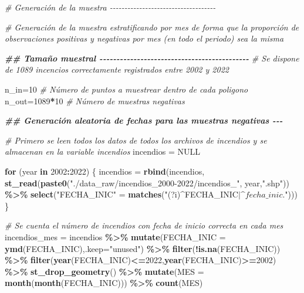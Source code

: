 \documentclass[12pt,a4paper,]{book}
\newenvironment{Shaded}{\begin{snugshade}}{\end{snugshade}}
\newcommand{\AttributeTok}[1]{\textcolor[rgb]{0.13,0.29,0.53}{#1}}
\newcommand{\CommentTok}[1]{\textcolor[rgb]{0.56,0.35,0.01}{\textit{#1}}}
\newcommand{\ConstantTok}[1]{\textcolor[rgb]{0.56,0.35,0.01}{#1}}
\newcommand{\ControlFlowTok}[1]{\textcolor[rgb]{0.13,0.29,0.53}{\textbf{#1}}}
\newcommand{\DecValTok}[1]{\textcolor[rgb]{0.00,0.00,0.81}{#1}}
\newcommand{\DocumentationTok}[1]{\textcolor[rgb]{0.56,0.35,0.01}{\textbf{\textit{#1}}}}
\newcommand{\FunctionTok}[1]{\textcolor[rgb]{0.13,0.29,0.53}{\textbf{#1}}}
\newcommand{\NormalTok}[1]{#1}
\newcommand{\OtherTok}[1]{\textcolor[rgb]{0.56,0.35,0.01}{#1}}
\newcommand{\SpecialCharTok}[1]{\textcolor[rgb]{0.81,0.36,0.00}{\textbf{#1}}}
\newcommand{\StringTok}[1]{\textcolor[rgb]{0.31,0.60,0.02}{#1}}
\numberwithin{dummy}{section}
\theoremstyle{ocrenumbox}
\theoremstyle{blacknumex}
\theoremstyle{blacknumbox}
\theoremstyle{ocrenum}
\theoremstyle{ocrenum}
\begin{document}
\begin{Shaded}
\begin{Highlighting}[]
\CommentTok{\# Generación de la muestra {-}{-}{-}{-}{-}{-}{-}{-}{-}{-}{-}{-}{-}{-}{-}{-}{-}{-}{-}{-}{-}{-}{-}{-}{-}{-}{-}{-}{-}{-}{-}{-}{-}{-}{-}{-}}

\CommentTok{\# Generación de la muestra estratificando por mes de forma que la proporción de observaciones positivas y negativas por mes (en todo el periodo) sea la misma}

\DocumentationTok{\#\#  Tamaño muestral {-}{-}{-}{-}{-}{-}{-}{-}{-}{-}{-}{-}{-}{-}{-}{-}{-}{-}{-}{-}{-}{-}{-}{-}{-}{-}{-}{-}{-}{-}{-}{-}{-}{-}{-}{-}{-}{-}{-}{-}{-}{-}{-}{-}}
\CommentTok{\# Se dispone de 1089 incencios correctamente registrados entre 2002 y 2022}

\NormalTok{n\_in}\OtherTok{=}\DecValTok{10} \CommentTok{\# Número de puntos a muestrear dentro de cada poligono}
\NormalTok{n\_out}\OtherTok{=}\DecValTok{1089}\SpecialCharTok{*}\DecValTok{10} \CommentTok{\# Número de muestras negativas}

\DocumentationTok{\#\#  Generación aleatoria de fechas para las muestras negativas {-}{-}{-}}

\CommentTok{\# Primero se leen todos los datos de todos los archivos de incendios y se almacenan en la variable incendios}
\NormalTok{incendios }\OtherTok{=} \ConstantTok{NULL}

\ControlFlowTok{for}\NormalTok{ (year }\ControlFlowTok{in} \DecValTok{2002}\SpecialCharTok{:}\DecValTok{2022}\NormalTok{) \{}
\NormalTok{  incendios }\OtherTok{=} \FunctionTok{rbind}\NormalTok{(incendios, }
                    \FunctionTok{st\_read}\NormalTok{(}\FunctionTok{paste0}\NormalTok{(}\StringTok{"./data\_raw/incendios\_2000{-}2022/incendios\_"}\NormalTok{,}
\NormalTok{                                   year,}\StringTok{".shp"}\NormalTok{)) }\SpecialCharTok{\%\textgreater{}\%} 
                      \FunctionTok{select}\NormalTok{(}\StringTok{"FECHA\_INIC"} \OtherTok{=} \FunctionTok{matches}\NormalTok{(}\StringTok{"(?i)\^{}FECHA\_INIC$|\^{}fecha\_inic.$"}\NormalTok{))) }
\NormalTok{\}}

\CommentTok{\# Se cuenta el número de incendios con fecha de inicio correcta en cada mes}
\NormalTok{incendios\_mes }\OtherTok{=}\NormalTok{ incendios }\SpecialCharTok{\%\textgreater{}\%} 
  \FunctionTok{mutate}\NormalTok{(}\AttributeTok{FECHA\_INIC =} \FunctionTok{ymd}\NormalTok{(FECHA\_INIC),}\AttributeTok{.keep=}\StringTok{"unused"}\NormalTok{) }\SpecialCharTok{\%\textgreater{}\%} 
  \FunctionTok{filter}\NormalTok{(}\SpecialCharTok{!}\FunctionTok{is.na}\NormalTok{(FECHA\_INIC)) }\SpecialCharTok{\%\textgreater{}\%} 
  \FunctionTok{filter}\NormalTok{(}\FunctionTok{year}\NormalTok{(FECHA\_INIC)}\SpecialCharTok{\textless{}=}\DecValTok{2022}\NormalTok{,}\FunctionTok{year}\NormalTok{(FECHA\_INIC)}\SpecialCharTok{\textgreater{}=}\DecValTok{2002}\NormalTok{) }\SpecialCharTok{\%\textgreater{}\%} 
  \FunctionTok{st\_drop\_geometry}\NormalTok{() }\SpecialCharTok{\%\textgreater{}\%} 
  \FunctionTok{mutate}\NormalTok{(}\AttributeTok{MES =} \FunctionTok{month}\NormalTok{(}\FunctionTok{month}\NormalTok{(FECHA\_INIC))) }\SpecialCharTok{\%\textgreater{}\%} 
  \FunctionTok{count}\NormalTok{(MES) }


\end{Highlighting}
\end{Shaded}
\end{document}
